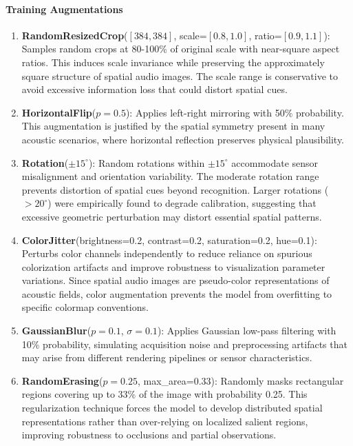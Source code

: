 \documentclass[11pt,a4paper]{article}
\begin{document}
\paragraph{Training Augmentations}
\begin{enumerate}[leftmargin=*]
\item \textbf{RandomResizedCrop}(\([384, 384]\), scale=\([0.8, 1.0]\), ratio=\([0.9, 1.1]\)): Samples random crops at 80-100\% of original scale with near-square aspect ratios. This induces scale invariance while preserving the approximately square structure of spatial audio images. The scale range is conservative to avoid excessive information loss that could distort spatial cues.

\item \textbf{HorizontalFlip}(\(p=0.5\)): Applies left-right mirroring with 50\% probability. This augmentation is justified by the spatial symmetry present in many acoustic scenarios, where horizontal reflection preserves physical plausibility.

\item \textbf{Rotation}(\(\pm15^\circ\)): Random rotations within \(\pm15^\circ\) accommodate sensor misalignment and orientation variability. The moderate rotation range prevents distortion of spatial cues beyond recognition. Larger rotations (\(>20^\circ\)) were empirically found to degrade calibration, suggesting that excessive geometric perturbation may distort essential spatial patterns.

\item \textbf{ColorJitter}(brightness=0.2, contrast=0.2, saturation=0.2, hue=0.1): Perturbs color channels independently to reduce reliance on spurious colorization artifacts and improve robustness to visualization parameter variations. Since spatial audio images are pseudo-color representations of acoustic fields, color augmentation prevents the model from overfitting to specific colormap conventions.

\item \textbf{GaussianBlur}(\(p=0.1\), \(\sigma=0.1\)): Applies Gaussian low-pass filtering with 10\% probability, simulating acquisition noise and preprocessing artifacts that may arise from different rendering pipelines or sensor characteristics.

\item \textbf{RandomErasing}(\(p=0.25\), max\_area=0.33): Randomly masks rectangular regions covering up to 33\% of the image with probability 0.25. This regularization technique \cite{zhong2020randomerasing} forces the model to develop distributed spatial representations rather than over-relying on localized salient regions, improving robustness to occlusions and partial observations.
\end{enumerate}
\end{document}
